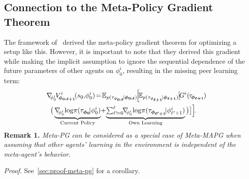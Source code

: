 \subsection{Connection to the Meta-Policy Gradient Theorem}\label{sec:meta-pg-theorem}
The framework of~\citet{alshedivat2018continuous} derived the meta-policy gradient theorem for optimizing a setup like this. 
However, it is important to note that they derived this gradient while making the implicit assumption to ignore the sequential dependence of the future parameters of other agents on $\phi^{i}_{0}$, resulting in the missing peer learning term:
\begin{align}\label{eqn:meta-policy-gradient}
\begin{split}
&\nabla_{\!\!\phi^{i}_{0}}\!V^{i}_{\!\bm{\phi}_{\bm{0:\ell+1}}}\!(s_0,\!\phi^{i}_{0})\!=\!\mathbb{E}_{p(\tau_{\bm{\phi}_{\bm{0:\ell}}}\!|\bm{\phi}_{\bm{0:\ell}})}\!\Big[\!\mathbb{E}_{p(\tau_{\bm{\phi}_{\bm{\ell+1}}}\!|\bm{\phi}_{\bm{\ell+1}})}\!\big[\!G^{i}(\hspace{-0.1em}\tau_{\hspace{-0.1em}\bm{\phi}_{\bm{\ell+1}}}\hspace{-0.1em})\\
&\;\;\big(\underbrace{\nabla_{\!\!\phi^{i}_{0}}\!\log\!\pi(\tau_{\bm{\phi}_{\bm{0}}}\!|\phi^{i}_{0})}_{\text{Current Policy}}\!+\!\underbrace{\smallsum\nolimits_{\ell'\!=0}^{\ell}\!\!\nabla_{\!\!\phi^{i}_{0}}\!\log\!\pi(\tau_{\bm{\phi}_{\bm{\ell'+1}}}\!|\phi^{i}_{\ell'+1})}_{\text{Own Learning}}\big)\big]\Big]\!.
\raisetag{30pt}
\end{split}
\end{align}
\textbf{Remark 1.} \textit{
Meta-PG can be considered as a special case of Meta-MAPG when assuming that other agents' learning in the environment is independent of the meta-agent's behavior.}

\textit{Proof.} \hspace{0.2em}See~\cref{sec:proof-meta-pg} for a corollary.\QEDB

